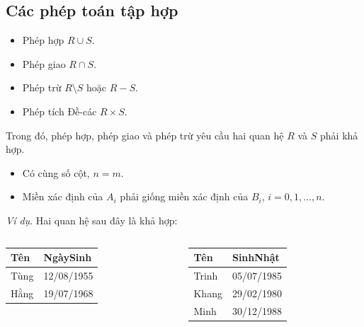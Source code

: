 \documentclass[11pt]{beamer}
\begin{document}
  \subsection{Các phép toán tập hợp}
  \begin{frame}
    \begin{itemize}
      \item<2-> Phép hợp $R \cup S$.
      \item<2-> Phép giao $R \cap S$.
      \item<2-> Phép trừ $R \setminus S$ hoặc $R - S$.
      \item<2-> Phép tích Đề-các $R \times S$.
    \end{itemize}
  \end{frame}
  \begin{frame}
    Trong đó, phép hợp, phép giao và phép trừ yêu cầu hai quan hệ $R$ và $S$ phải khả hợp.
  \end{frame}
  \begin{frame}
    \begin{itemize}
      \item<2-> Có cùng số cột, $n = m$.
      \item<3-> Miền xác định của $A_i$ phải giống miền xác định của $B_i$, $i = 0, 1, \dots, n$.
    \end{itemize}
  \end{frame}
  \begin{frame}
    \textit{Ví dụ}. Hai quan hệ sau đây là khả hợp:
    \begin{center}
      \begin{columns}[T]
        \begin{column}{0.5\textwidth}
          \begin{tabular}{|l|l|}
            \hline
            Tên & NgàySinh \\ \hline
            Tùng & 12/08/1955 \\ \hline
            Hằng & 19/07/1968 \\ \hline        
          \end{tabular}
        \end{column}
        \begin{column}{0.5\textwidth}
          \begin{tabular}{|l|l|}
            \hline
            Tên & SinhNhật \\ \hline
            Trinh & 05/07/1985 \\ \hline
            Khang & 29/02/1980 \\ \hline 
            Minh & 30/12/1988 \\ \hline
          \end{tabular}
        \end{column}
      \end{columns}
    \end{center}
  \end{frame}
\end{document}
